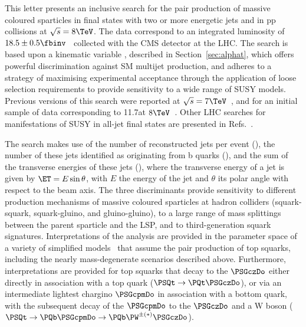 This letter presents an inclusive search for the pair production of
massive coloured sparticles in final states with two or more energetic
jets and \ptvecmiss in pp collisions at $\sqrt{s} = 8\TeV$. The data
correspond to an integrated luminosity of $18.5 \pm
0.5\fbinv$~\cite{lumi} collected with the CMS detector at the LHC. The
search is based upon a kinematic variable \alphat, described in
Section~\ref{sec:alphat}, which offers powerful discrimination against
SM multijet production, and adheres to a strategy of maximising
experimental acceptance through the application of loose selection
requirements to provide sensitivity to a wide range of SUSY
models. Previous versions of this search were reported at $\sqrt{s} =
7\TeV$~\cite{RA1Paper, RA1Paper2011, RA1Paper2011FULL}, and for an
initial sample of data corresponding to 11.7\fbinv at
$8\TeV$~\cite{RA1Paper2012}. Other LHC searches for manifestations of
SUSY in all-jet final states are presented in Refs.~\cite{atlas-0,
  atlas-1, atlas-2, atlas-3, atlas-4, atlas-5, atlas-11, atlas-7,
  atlas-8, atlas-9, atlas-10, atlas-12, cms-1, cms-2, cms-3, cms-4,
  cms-8,cms-11,cms-5, cms-6, cms-7, cms-10, cms-12, cms-13, atlas-13,
  atlas-6, cms-9}.

The search makes use of the number of reconstructed jets per event
(\njet), the number of these jets identified as originating from b
quarks (\nb), and the sum of the transverse energies of these jets
(\scalht), where the transverse energy of a jet is given by $\ET =
E\sin\theta$, with $E$ the energy of the jet and $\theta$ its polar
angle with respect to the beam axis. The three discriminants provide
sensitivity to different production mechanisms of massive coloured
sparticles at hadron colliders (\ie squark-squark, squark-gluino, and
gluino-gluino), to a large range of mass splittings between the parent
sparticle and the LSP, and to third-generation squark signatures.
Interpretations of the analysis are provided in the parameter space of
a variety of simplified models~\cite{Alwall:2008ag, Alwall:2008va,
  sms} that assume the pair production of top squarks, including the
nearly mass-degenerate scenarios described above. Furthermore,
interpretations are provided for top squarks that decay to the
$\PSGczDo$ either directly in association with a top quark ($\PSQt \to
\PQt \PSGczDo$), or via an intermediate lightest chargino $\PSGcpmDo$
in association with a bottom quark, with the subsequent decay of the
$\PSGcpmDo$ to the $\PSGczDo$ and a W boson ($\PSQt \to \PQb \PSGcpmDo
\to {\PQb\PW}^{\pm(*)} \PSGczDo$).

